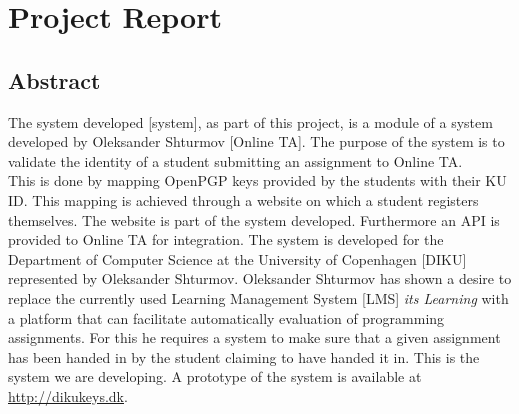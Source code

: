 \documentclass[11pt,a4paper]{report}
\begin{document}
\chapter{Project Report}\label{ch:Project_Report}

\section{Abstract}\label{sec:Abstract}
The system developed [system], as part of this project, is a module of a system developed by Oleksander Shturmov [Online TA]. The purpose of the system is to validate the identity of a student submitting an assignment to Online TA. \\
This is done by mapping OpenPGP keys provided by the students with their KU ID. This mapping is achieved through a website on which a student registers themselves. The website is part of the system developed. Furthermore an API is provided to Online TA for integration. The system is developed for the Department of Computer Science at the University of Copenhagen [DIKU] represented by Oleksander Shturmov. Oleksander Shturmov has shown a desire to replace the currently used Learning Management System [LMS] \textit{its Learning} with a platform that can facilitate automatically evaluation of programming assignments. For this he requires a system to make sure that a given assignment has been handed in by the student claiming to have handed it in. This is the system we are developing.
A prototype of the system is available at \url{http://dikukeys.dk}.
\end{document}
